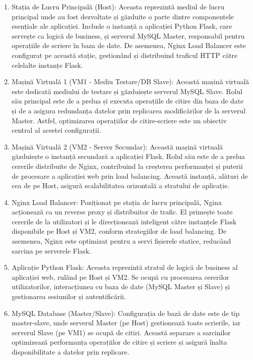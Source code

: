 \documentclass[12pt, a4paper, oneside, romanian]{teza-upb}
\begin{document}
\begin{enumerate}
\item Stația de Lucru Principală (Host): Aceasta reprezintă mediul de lucru principal unde au fost dezvoltate și găzduite o parte dintre componentele esențiale ale aplicației. Include o instanță a aplicației Python Flask, care servește ca logică de business, și serverul MySQL Master, responsabil pentru operațiile de scriere în baza de date. De asemenea, Nginx Load Balancer este configurat pe această stație, gestionând și distribuind traficul HTTP către celelalte instanțe Flask.
\item Mașină Virtuală 1 (VM1 - Mediu Testare/DB Slave): Această mașină virtuală este dedicată mediului de testare și găzduiește serverul MySQL Slave. Rolul său principal este de a prelua și executa operațiile de citire din baza de date și de a asigura redundanța datelor prin replicarea modificărilor de la serverul Master. Astfel, optimizarea operațiilor de citire-scriere este un obiectiv central al acestei configurații.
\item Mașină Virtuală 2 (VM2 - Server Secundar): Această mașină virtuală găzduiește o instanță secundară a aplicației Flask. Rolul său este de a prelua cererile distribuite de Nginx, contribuind la creșterea performanței și puterii de procesare a aplicației web prin load balancing. Această instanță, alături de cea de pe Host, asigură scalabilitatea orizontală a stratului de aplicație.
\item Nginx Load Balancer: Poziționat pe stația de lucru principală, Nginx acționează ca un reverse proxy și distribuitor de trafic. El primește toate cererile de la utilizatori și le direcționează inteligent către instanțele Flask disponibile pe Host și VM2, conform strategiilor de load balancing. De asemenea, Nginx este optimizat pentru a servi fișierele statice, reducând sarcina pe serverele Flask.
\item Aplicație Python Flask: Aceasta reprezintă stratul de logică de business al aplicației web, rulând pe Host și VM2. Se ocupă cu procesarea cererilor utilizatorilor, interacțiunea cu baza de date (MySQL Master și Slave) și gestionarea sesiunilor și autentificării.
\item MySQL Database (Master/Slave): Configurația de bază de date este de tip master-slave, unde serverul Master (pe Host) gestionează toate scrierile, iar serverul Slave (pe VM1) se ocupă de citiri. Această separare a sarcinilor optimizează performanța operațiilor de citire și scriere și asigură înalta disponibilitate a datelor prin replicare.

\end{enumerate}
\end{document}

